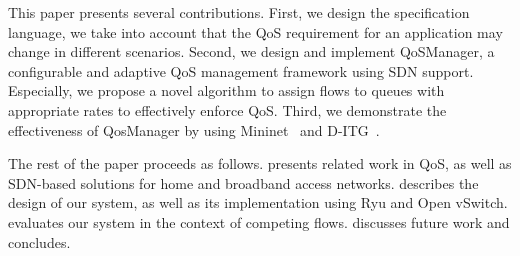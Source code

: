 This paper presents several contributions. First, we design the specification language,  we take into account
that the QoS requirement for an application may change in different scenarios. Second, we design and implement
QoSManager, a configurable and adaptive QoS management framework using SDN support. Especially, we propose a novel
algorithm to assign flows to queues with appropriate rates to effectively enforce QoS. Third, we demonstrate the
effectiveness of QosManager by using Mininet~\cite{mininet} and D-ITG~\cite{d-itg}.

The rest of the paper proceeds as follows. 
 presents related work in QoS, as well as SDN-based solutions
for home and broadband access networks. 
 describes the design of our system, as well as its implementation using Ryu and Open vSwitch.
 evaluates
our system in the
context of competing flows.  discusses future work
and concludes.
